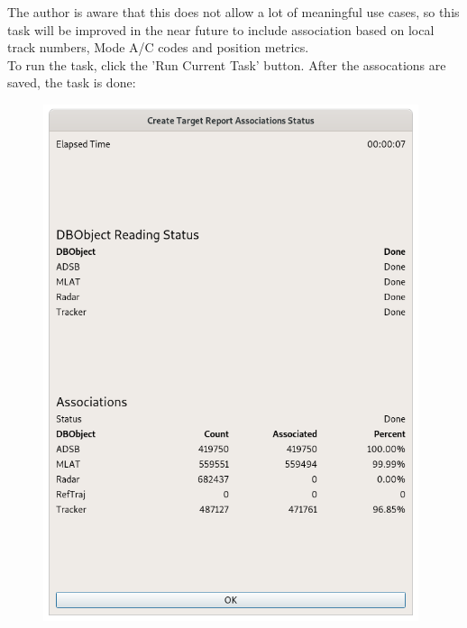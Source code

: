 The author is aware that this does not allow a lot of meaningful use cases, so this task will be improved in the near future to include association based on local track numbers, Mode A/C codes and position metrics. \\

To run the task, click the 'Run Current Task' button. After the assocations are saved, the task is done:

\begin{figure}[H]
  \center
    \includegraphics[width=11cm]{../screenshots/tr_association_done.png}
\end{figure}
